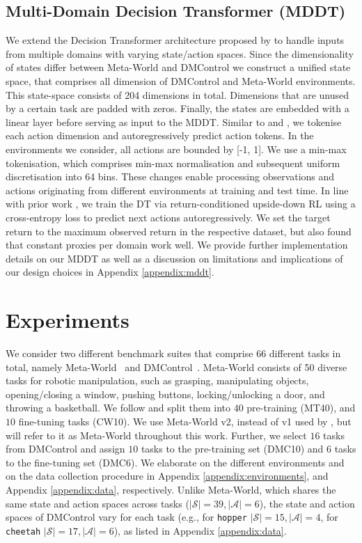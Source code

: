\documentclass{article}
\begin{document}
\subsection{Multi-Domain Decision Transformer (MDDT)}
We extend the Decision Transformer architecture proposed by \citet{Chen:21} to handle inputs from multiple domains with varying state/action spaces.
Since the dimensionality of states differ between Meta-World and DMControl we construct a unified state space, that comprises all dimension of DMControl and Meta-World environments. 
This state-space consists of 204 dimensions in total.
Dimensions that are unused by a certain task are padded with zeros.
Finally, the states are embedded with a linear layer before serving as input to the MDDT.
Similar to \citet{Reed:22} and \citet{Brohan:22}, we tokenise each action dimension and autoregressively predict action tokens. 
In the environments we consider, all actions are bounded by [-1, 1]. 
We use a min-max tokenisation, which comprises min-max normalisation and subsequent uniform discretisation into 64 bins. 
These changes enable processing observations and actions originating from different environments at training and test time. 
In line with prior work \citep{Chen:21, Lee:22}, we train the DT via return-conditioned upside-down RL using a cross-entropy loss to predict next actions autoregressively.
We set the target return to the maximum observed return in the respective dataset, but also found that constant proxies per domain work well.
We provide further implementation details on our MDDT as well as a discussion on limitations and implications of our design choices in Appendix \ref{appendix:mddt}.


\section{Experiments}\label{sec:experiments}
We consider two different benchmark suites that comprise 66 different tasks in total, namely Meta-World~\citep{Yu:22,Wolczyk:21} and DMControl~\citep{Tassa:18}.
Meta-World consists of 50 diverse tasks for robotic manipulation, such as grasping, manipulating objects, opening/closing a window, pushing buttons, locking/unlocking a door, and throwing a basketball. 
We follow \citet{Wolczyk:21} and split them into $40$ pre-training (MT40), and $10$ fine-tuning tasks (CW10). 
We use Meta-World v2, instead of v1 used by \citet{Wolczyk:21}, but will refer to it as Meta-World throughout this work.
Further, we select $16$ tasks from DMControl and assign $10$ tasks to the pre-training set (DMC10) and $6$ tasks to the fine-tuning set (DMC6).
We elaborate on the different environments and on the data collection procedure in Appendix \ref{appendix:environments}, and Appendix \ref{appendix:data}, respectively.
Unlike Meta-World, which shares the same state and action spaces across tasks ($|\mathcal{S}|=39, |\mathcal{A}|=6 $), the state and action spaces of DMControl vary for each task %
(e.g., for \texttt{hopper} $|\mathcal{S}|=15, |\mathcal{A}|=4$, for \texttt{cheetah} $|\mathcal{S}|=17, |\mathcal{A}|=6$), as listed in Appendix \ref{appendix:data}.
\end{document}
